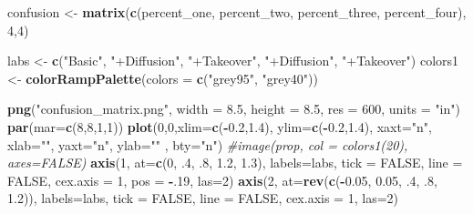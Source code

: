 \documentclass[]{book}
\newenvironment{Shaded}{\begin{snugshade}}{\end{snugshade}}
\newcommand{\KeywordTok}[1]{\textcolor[rgb]{0.13,0.29,0.53}{\textbf{{#1}}}}
\newcommand{\DataTypeTok}[1]{\textcolor[rgb]{0.13,0.29,0.53}{{#1}}}
\newcommand{\DecValTok}[1]{\textcolor[rgb]{0.00,0.00,0.81}{{#1}}}
\newcommand{\FloatTok}[1]{\textcolor[rgb]{0.00,0.00,0.81}{{#1}}}
\newcommand{\StringTok}[1]{\textcolor[rgb]{0.31,0.60,0.02}{{#1}}}
\newcommand{\CommentTok}[1]{\textcolor[rgb]{0.56,0.35,0.01}{\textit{{#1}}}}
\newcommand{\OtherTok}[1]{\textcolor[rgb]{0.56,0.35,0.01}{{#1}}}
\newcommand{\OperatorTok}[1]{\textcolor[rgb]{0.81,0.36,0.00}{\textbf{{#1}}}}
\newcommand{\NormalTok}[1]{{#1}}
\theoremstyle{definition}
\theoremstyle{definition}
\theoremstyle{definition}
\theoremstyle{remark}
\begin{document}
\begin{Shaded}
\begin{Highlighting}[]
\NormalTok{confusion <-}\StringTok{ }\KeywordTok{matrix}\NormalTok{(}\KeywordTok{c}\NormalTok{(percent_one, percent_two, percent_three, percent_four), }\DecValTok{4}\NormalTok{,}\DecValTok{4}\NormalTok{)}

\NormalTok{labs <-}\StringTok{ }\KeywordTok{c}\NormalTok{(}\StringTok{"Basic"}\NormalTok{, }\StringTok{"+Diffusion"}\NormalTok{, }\StringTok{"+Takeover"}\NormalTok{, }\StringTok{"+Diffusion"}\NormalTok{,  }\StringTok{"+Takeover"}\NormalTok{)}
\NormalTok{colors1 <-}\StringTok{ }\KeywordTok{colorRampPalette}\NormalTok{(}\DataTypeTok{colors =} \KeywordTok{c}\NormalTok{(}\StringTok{"grey95"}\NormalTok{, }\StringTok{"grey40"}\NormalTok{))}


\KeywordTok{png}\NormalTok{(}\StringTok{"confusion_matrix.png"}\NormalTok{, }\DataTypeTok{width =} \FloatTok{8.5}\NormalTok{, }\DataTypeTok{height =} \FloatTok{8.5}\NormalTok{, }\DataTypeTok{res =} \DecValTok{600}\NormalTok{, }\DataTypeTok{units =} \StringTok{"in"}\NormalTok{)}
\KeywordTok{par}\NormalTok{(}\DataTypeTok{mar=}\KeywordTok{c}\NormalTok{(}\DecValTok{8}\NormalTok{,}\DecValTok{8}\NormalTok{,}\DecValTok{1}\NormalTok{,}\DecValTok{1}\NormalTok{))}
\KeywordTok{plot}\NormalTok{(}\DecValTok{0}\NormalTok{,}\DecValTok{0}\NormalTok{,}\DataTypeTok{xlim=}\KeywordTok{c}\NormalTok{(}\OperatorTok{-}\FloatTok{0.2}\NormalTok{,}\FloatTok{1.4}\NormalTok{), }\DataTypeTok{ylim=}\KeywordTok{c}\NormalTok{(}\OperatorTok{-}\FloatTok{0.2}\NormalTok{,}\FloatTok{1.4}\NormalTok{), }\DataTypeTok{xaxt=}\StringTok{"n"}\NormalTok{, }\DataTypeTok{xlab=}\StringTok{""}\NormalTok{, }\DataTypeTok{yaxt=}\StringTok{"n"}\NormalTok{, }\DataTypeTok{ylab=}\StringTok{""}\NormalTok{ , }\DataTypeTok{bty=}\StringTok{"n"}\NormalTok{)}
\CommentTok{#image(prop, col = colors1(20), axes=FALSE)}
\KeywordTok{axis}\NormalTok{(}\DecValTok{1}\NormalTok{, }\DataTypeTok{at=}\KeywordTok{c}\NormalTok{(}\DecValTok{0}\NormalTok{, .}\DecValTok{4}\NormalTok{, .}\DecValTok{8}\NormalTok{, }\FloatTok{1.2}\NormalTok{, }\FloatTok{1.3}\NormalTok{), }\DataTypeTok{labels=}\NormalTok{labs, }\DataTypeTok{tick =} \OtherTok{FALSE}\NormalTok{, }\DataTypeTok{line =} \OtherTok{FALSE}\NormalTok{, }\DataTypeTok{cex.axis =} \DecValTok{1}\NormalTok{, }\DataTypeTok{pos =} \OperatorTok{-}\NormalTok{.}\DecValTok{19}\NormalTok{, }\DataTypeTok{las=}\DecValTok{2}\NormalTok{)}
\KeywordTok{axis}\NormalTok{(}\DecValTok{2}\NormalTok{, }\DataTypeTok{at=}\KeywordTok{rev}\NormalTok{(}\KeywordTok{c}\NormalTok{(}\OperatorTok{-}\FloatTok{0.05}\NormalTok{, }\FloatTok{0.05}\NormalTok{, .}\DecValTok{4}\NormalTok{, .}\DecValTok{8}\NormalTok{, }\FloatTok{1.2}\NormalTok{)), }\DataTypeTok{labels=}\NormalTok{labs, }\DataTypeTok{tick =} \OtherTok{FALSE}\NormalTok{, }\DataTypeTok{line =} \OtherTok{FALSE}\NormalTok{, }\DataTypeTok{cex.axis =} \DecValTok{1}\NormalTok{, }\DataTypeTok{las=}\DecValTok{2}\NormalTok{)}

\end{Highlighting}
\end{Shaded}
\end{document}

